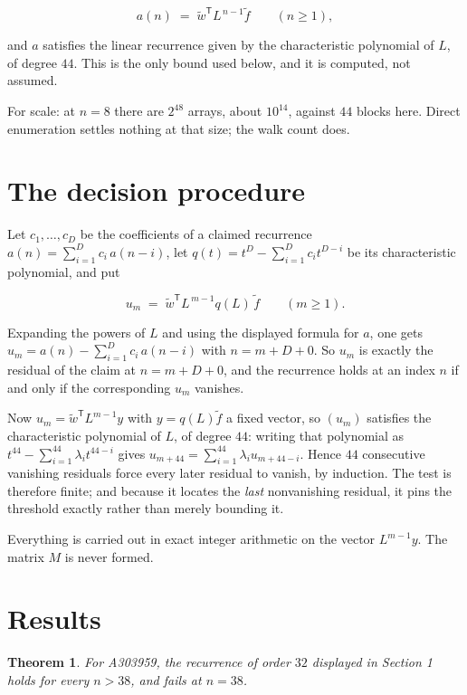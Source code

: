 \documentclass[11pt]{article}
\newtheorem{theorem}{Theorem}
\theoremstyle{definition}
\begin{document}
\[a(n) \;=\; \tilde w^{\mathsf T} L^{\,n-1} \tilde f \qquad (n \ge 1),\]

and $a$ satisfies the linear recurrence given by the characteristic polynomial of $L$, of degree $44$. This is the only bound used below, and it is computed, not assumed.

For scale: at $n = 8$ there are $2^{48}$ arrays, about $10^{14}$, against $44$ blocks here. Direct enumeration settles nothing at that size; the walk count does.

\section{The decision procedure}

Let $c_1,\dots,c_D$ be the coefficients of a claimed recurrence $a(n) = \sum_{i=1}^{D} c_i\,a(n-i)$, let $q(t) = t^{D} - \sum_{i=1}^{D} c_i t^{D-i}$ be its characteristic polynomial, and put

\[u_m \;=\; \tilde w^{\mathsf T} L^{\,m-1} q(L)\,\tilde f \qquad (m \ge 1).\]

Expanding the powers of $L$ and using the displayed formula for $a$, one gets $u_m = a(n) - \sum_{i=1}^{D} c_i\,a(n-i)$ with $n = m + D + 0$. So $u_m$ is exactly the residual of the claim at $n = m + D + 0$, and the recurrence holds at an index $n$ if and only if the corresponding $u_m$ vanishes.

Now $u_m = \tilde w^{\mathsf T} L^{m-1} y$ with $y = q(L)\tilde f$ a fixed vector, so $(u_m)$ satisfies the characteristic polynomial of $L$, of degree $44$: writing that polynomial as $t^{44} - \sum_{i=1}^{44} \lambda_i t^{44-i}$ gives $u_{m+44} = \sum_{i=1}^{44} \lambda_i u_{m+44-i}$. Hence $44$ consecutive vanishing residuals force every later residual to vanish, by induction. The test is therefore finite; and because it locates the {\itshape last} nonvanishing residual, it pins the threshold exactly rather than merely bounding it.

Everything is carried out in exact integer arithmetic on the vector $L^{m-1}y$. The matrix $M$ is never formed.

\section{Results}

\begin{theorem} For A303959, the recurrence of order $32$ displayed in Section 1 holds for every $n > 38$, and fails at $n = 38$.\end{theorem}
\end{document}
